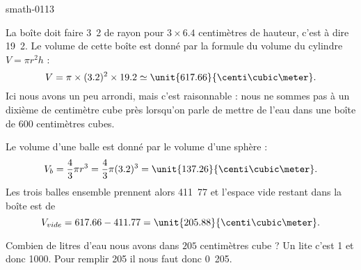 
\begin{corrige}{smath-0113}

    La boîte doit faire \unit{3.2}{\centi\meter} de rayon pour \( 3\times 6.4\) centimètres de hauteur, c'est à dire \unit{19.2}{\centi\meter}. Le volume de cette boîte est donné par la formule du volume du cylindre \( V=\pi r^2h\) :
    \begin{equation}
        V=\pi\times(3.2)^2\times 19.2\simeq\unit{617.66}{\centi\cubic\meter}.
    \end{equation}
    Ici nous avons un peu arrondi, mais c'est raisonnable : nous ne sommes pas à un dixième de centimètre cube près lorsqu'on parle de mettre de l'eau dans une boîte de \( 600\) centimètres cubes.

    Le volume d'une balle est donné par le volume d'une sphère :
    \begin{equation}
        V_b=\frac{ 4 }{ 3 }\pi r^3=\frac{ 4 }{ 3 }\pi(3.2)^3=\unit{137.26}{\centi\cubic\meter}.
    \end{equation}
    Les trois balles ensemble prennent alors \unit{411.77}{\centi\cubic\meter} et l'espace vide restant dans la boîte est de
    \begin{equation}
        V_{vide}=617.66-411.77=\unit{205.88}{\centi\cubic\meter}.
    \end{equation}
    
    Combien de litres d'eau nous avons dans \( 205\) centimètres cube ? Un lite c'est \unit{1}{\deci\cubic\meter} et donc \unit{1000}{\centi\cubic\meter}. Pour remplir \unit{205}{\centi\cubic\meter} il nous faut donc \unit{0.205}{\liter}.


\end{corrige}
